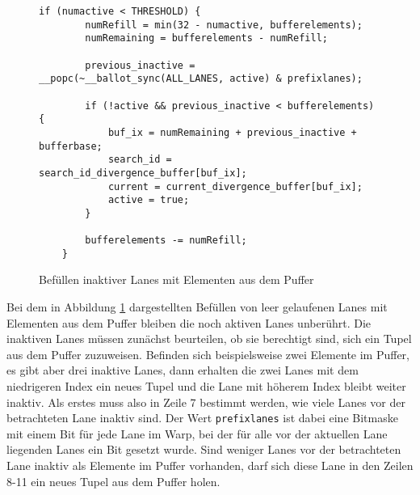 \begin{figure}[ht]
	\begin{lstlisting}[language=MyC++]
	if (numactive < THRESHOLD) {
		numRefill = min(32 - numactive, bufferelements);
		numRemaining = bufferelements - numRefill;
		
		previous_inactive = __popc(~__ballot_sync(ALL_LANES, active) & prefixlanes);
		
		if (!active && previous_inactive < bufferelements) {
			buf_ix = numRemaining + previous_inactive + bufferbase;
			search_id = search_id_divergence_buffer[buf_ix];
			current = current_divergence_buffer[buf_ix];
			active = true;
		}
		
		bufferelements -= numRefill;
	}
	\end{lstlisting}
	\caption{Befüllen inaktiver Lanes mit Elementen aus dem Puffer}
	\label{refill_code}
\end{figure}

Bei dem in Abbildung \ref{refill_code} dargestellten Befüllen von leer gelaufenen Lanes mit Elementen aus dem Puffer bleiben die noch aktiven Lanes unberührt.
Die inaktiven Lanes müssen zunächst beurteilen, ob sie berechtigt sind, sich ein Tupel aus dem Puffer zuzuweisen.
Befinden sich beispielsweise zwei Elemente im Puffer, es gibt aber drei inaktive Lanes, dann erhalten die zwei Lanes mit dem niedrigeren Index ein neues Tupel und die Lane mit höherem Index bleibt weiter inaktiv.
Als erstes muss also in Zeile 7 bestimmt werden, wie viele Lanes vor der betrachteten Lane inaktiv sind.
Der Wert \texttt{prefixlanes} ist dabei eine Bitmaske mit einem Bit für jede Lane im Warp, bei der für alle vor der aktuellen Lane liegenden Lanes ein Bit gesetzt wurde.
Sind weniger Lanes vor der betrachteten Lane inaktiv als Elemente im Puffer vorhanden, darf sich diese Lane in den Zeilen 8-11 ein neues Tupel aus dem Puffer holen.

